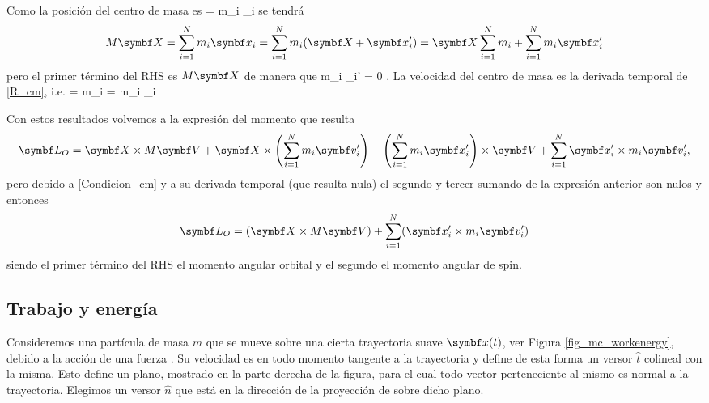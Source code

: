 \documentclass[10pt,oneside]{CBFT_book}
\begin{document}
Como la posición del centro de masa es
\be
	 =   m_i _i  
	\label{R_cm}
\ee
se tendrá 
\[
	M \vb{X} = \Sum{i=1}{N} m_i \vb{x}_i = \Sum{i=1}{N} m_i ( \vb{X} + \vb{x}_i' ) =
	\vb{X} \Sum{i=1}{N} m_i + \Sum{i=1}{N} m_i \vb{x}_i'
\]
pero el primer término del RHS es $M\vb{X}$ de manera que 
\be
	 m_i _i' = 0 .
	\label{Condicion_cm}
\ee
La velocidad del centro de masa es la derivada temporal de \eqref{R_cm}, i.e.
\be
	 =   m_i  = 
	  m_i _i
	\label{V_cm}
\ee

Con estos resultados volvemos a la expresión del momento que resulta 
\[
	\vb{L}_O = \vb{X} \times M \vb{V}  + \vb{X} \times \left( \Sum{i=1}{N} m_i \vb{v}_i' \right) +
	\left( \Sum{i=1}{N} m_i \vb{x}_i' \right) \times \vb{V} + \Sum{i=1}{N} \vb{x}_i' \times m_i \vb{v}_i',
\]
pero debido a \eqref{Condicion_cm} y a su derivada temporal (que resulta nula) el segundo y tercer sumando de la 
expresión anterior son nulos y entonces 
\[
	\vb{L}_O = \left( \vb{X} \times M \vb{V} \right) + \Sum{i=1}{N} ( \vb{x}_i' \times m_i \vb{v}_i' )
\]
siendo el primer término del RHS el momento angular orbital y el segundo el momento angular de spin.


\subsection{Trabajo y energía}

Consideremos una partícula de masa $ m $ que se mueve sobre una cierta trayectoria suave $\vb{x}(t)$, ver {Figura} 
\ref{fig_mc_workenergy}, debido a la acción de una fuerza .
Su velocidad  es en todo momento tangente a la trayectoria y define de esta forma un versor $ \hat{t} $
colineal con la misma. Esto define un plano, mostrado en la parte derecha de la figura, para el cual todo vector
perteneciente al mismo es normal a la trayectoria. Elegimos un versor $ \hat{n} $ que está en la dirección de
la proyección de  sobre dicho plano.
\end{document}
